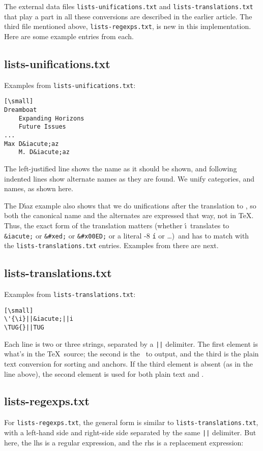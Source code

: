\documentclass[final]{ltugboat}
\def\code#1{{\tt #1}}
\begin{document}
The external data files \code{lists-unifications.txt} and
\code{lists-translations.txt} that play a part in all these conversions
are described in the earlier article. The third file mentioned
above, \code{lists-regexps.txt}, is new in this implementation. Here
are some example entries from each.

\subsection{lists-unifications.txt}

Examples from \code{lists-unifications.txt}:
\begin{verbatim}[\small]
Dreamboat
    Expanding Horizons
    Future Issues
...
Max D&iacute;az
    M. D&iacute;az
\end{verbatim}
The left-justified line shows the name as it should be shown, and
following indented lines show alternate names as they are found. We
unify categories, and names, as shown here.

The D\'\i{}az example also shows that we do unifications after the
translation to \HTML, so both the canonical name and the alternates are
expressed that way, not in \TeX. Thus, the exact form of the translation
matters (whether \'\i\ translates to \verb|&iacute;| or \verb|&#xed;| or
\verb|&#x00ED;| or a literal -8 \code{\'\i} or \ldots)\ and
has to match with the \code{lists-translations.txt} entries. Examples
from there are next.

\subsection{lists-translations.txt}

Examples from \code{lists-translations.txt}:
\begin{verbatim}[\small]
\'{\i}||&iacute;||i
\TUG{}||TUG
\end{verbatim}
Each line is two or three strings, separated by a \code{||} delimiter.
The first element is what's in the  \TeX\ source; the second is the
\HTML\ to output, and the third is the plain text conversion for sorting
and anchors. If the third element is absent (as in the  line
above), the second element is used for both plain text and \HTML.

\subsection{lists-regexps.txt}

For \code{lists-regexps.txt}, the general form is similar to
\code{lists-translations.txt}, with a left-hand side and right-side side
separated by the same \code{||} delimiter. But here, the lhs is a
regular expression, and the rhs is a replacement expression:
\end{document}
